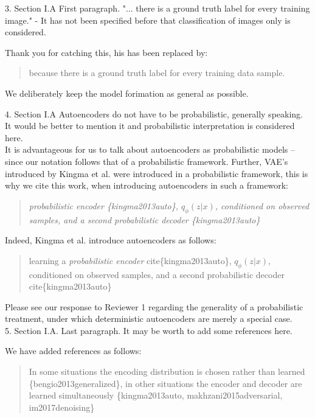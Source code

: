 \documentclass[a4paper,11pt]{article}
\begin{document}
{\color{blue}
3. Section I.A First paragraph. "... there is a ground truth label for every training image." - It has not been specified before that classification of images only is considered.} \newline

Thank you for catching this, his has been replaced by:
\begin{quote}
    {\color{red} because there is a ground truth label for every training data sample.}
\end{quote}
We deliberately keep the model forimation as general as possible. \newline

{\color{blue}
4. Section I.A Autoencoders do not have to be probabilistic, generally speaking. It would be better to mention it and probabilistic interpretation is considered here.}\\

It is advantageous for us to talk about autoencoders as probabilistic models -- since our notation follows that of a probabilistic framework. Further, VAE's introduced by Kingma et al. were introduced in a probabilistic framework, this is why we cite this work, when introducing autoencoders in such a framework: 

    \begin{quote}
    {\it probabilistic encoder \{kingma2013auto\}, $q_\phi(z|x)$, conditioned on observed samples, and a second probabilistic decoder \{kingma2013auto\} }
    \end{quote}

Indeed, Kingma et al. introduce autoencoders as follows:
    \begin{quote}
        {\color{green} learning a \textit{probabilistic encoder} cite\{kingma2013auto\}, $q_\phi(z|x)$, conditioned on observed samples, and a second probabilistic decoder cite\{kingma2013auto\}}
    \end{quote} 

Please see our response to Reviewer 1 regarding the generality of a probabilistic treatment, under which deterministic autoencoders are merely a special case.\\

{\color{blue}
5. Section I.A. Last paragraph. It may be worth to add some references here.} \newline

We have added references as follows:
\begin{quote}
    {\color{red} In some situations the encoding distribution is chosen rather than learned \{bengio2013generalized\}, in other situations the encoder and decoder are learned simultaneously \{kingma2013auto, makhzani2015adversarial, im2017denoising\}}
\end{quote}
\end{document}

